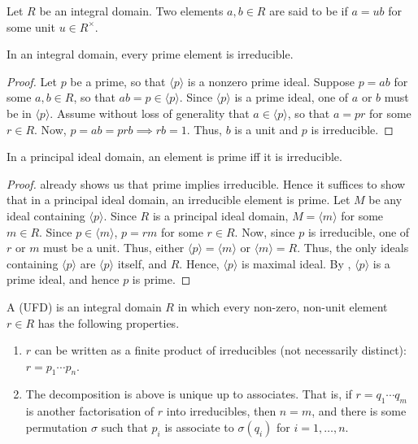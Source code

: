 \begin{defn}
    Let $R$ be an integral domain. Two elements $a,b \in R$ are said to be  if $a = ub$ for some unit $u \in R^{\times}$.
\end{defn}

\begin{prop} \label{prop:prime-implies-irreducible}
    In an integral domain, every prime element is irreducible.
\end{prop}
\begin{proof}
    Let $p$ be a prime, so that $\langle p \rangle$ is a nonzero prime ideal. Suppose $p = ab$ for some $a,b \in R$, so that $ab = p \in \langle p \rangle$. Since $\langle p \rangle$ is a prime ideal, one of $a$ or $b$ must be in $\langle p \rangle$. Assume without loss of generality that $a \in \langle p \rangle$, so that $a = pr$ for some $r \in R$. Now, $p = ab = prb \implies rb = 1$. Thus, $b$ is a unit and $p$ is irreducible.
\end{proof}

\begin{prop} \label{prop:PID-prime-iff-irreducible}
    In a principal ideal domain, an element is prime iff it is irreducible.
\end{prop}
\begin{proof}
     already shows us that prime implies irreducible. Hence it suffices to show that in a principal ideal domain, an irreducible element is prime. Let $M$ be any ideal containing $\langle p \rangle$. Since $R$ is a principal ideal domain, $M = \langle m \rangle$ for some $m \in R$. Since $p \in \langle m \rangle$, $p = rm$ for some $r \in R$. Now, since $p$ is irreducible, one of $r$ or $m$ must be a unit. Thus, either $\langle p \rangle = \langle m \rangle$ or $\langle m \rangle = R$. Thus, the only ideals containing $\langle p \rangle$ are $\langle p \rangle$ itself, and $R$. Hence, $\langle p \rangle$ is maximal ideal. By , $\langle p \rangle$ is a prime ideal, and hence $p$ is prime.
\end{proof}

\begin{defn}
    A  (UFD) is an integral domain $R$ in which every non-zero, non-unit element $r \in R$ has the following properties. 
    \begin{enumerate}
        \item $r$ can be written as a finite product of irreducibles (not necessarily distinct): $r = p_1 \cdots p_n$.
        \item The decomposition is above is unique up to associates. That is, if $r = q_1 \cdots q_m$ is another factorisation of $r$ into irreducibles, then $n = m$, and there is some permutation $\sigma$ such that $p_i$ is associate to $\sigma(q_i)$ for $i = 1, \ldots, n$.
    \end{enumerate}
\end{defn}

